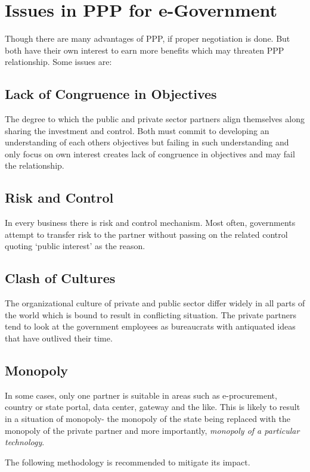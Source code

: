 \section{Issues in PPP for e-Government}
Though there are many advantages of PPP, if proper negotiation is done. But both have their own interest to earn more benefits which may threaten PPP relationship. Some issues are:

\subsection{Lack of Congruence in Objectives}
The degree to which the public and private sector partners align themselves along sharing the investment and control. Both must commit to developing an understanding of each others objectives but failing in such understanding and only focus on own interest creates lack of congruence in objectives and may fail the relationship.

\subsection{Risk and Control}
In every business there is risk and control mechanism. Most often, governments attempt to transfer risk to the partner without passing on the related control quoting ‘public interest’ as the reason.

\subsection{Clash of Cultures}
The organizational culture of private and public sector differ widely in all parts of the world which is bound to result in conflicting situation. The private partners tend to look at the government employees as bureaucrats with antiquated ideas that have outlived their time. 

\subsection{Monopoly}
In some cases, only one partner is suitable in areas such as e-procurement, country or state portal, data center, gateway and the like. This is likely to result in a situation of monopoly- the monopoly of the state being replaced with the monopoly of the private partner and more importantly, \textit{monopoly of a particular technology}.

The following methodology is recommended to mitigate its impact.

